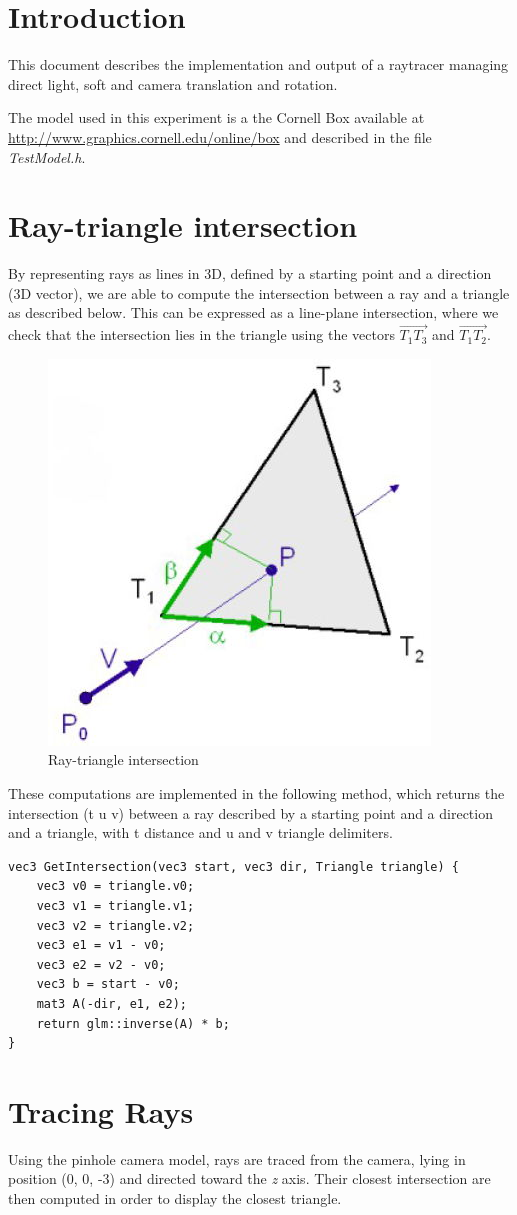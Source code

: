 \section*{Introduction}
This document describes the implementation and output of a raytracer managing direct light, soft  and camera translation and rotation.

The model used in this experiment is a the Cornell Box available at \url{http://www.graphics.cornell.edu/online/box} and described in the file \textit{TestModel.h}.

\setcounter{section}{0} 

\section{Ray-triangle intersection}
By representing rays as lines in 3D, defined by a starting point and a direction (3D vector), we are able to compute the intersection between a ray and a triangle as described below.
This can be expressed as a line-plane intersection, where we check that the intersection lies in the triangle using the vectors $\vec{T_1T_3}$ and $\vec{T_1T_2}$.

\begin{figure}[H]
\centering
\includegraphics[width=0.2\linewidth]{img/ray.jpg}
\caption{Ray-triangle intersection}
\end{figure}

These computations are implemented in the following method, which returns the intersection (t u v) between a ray described by a starting point and a direction and a triangle, with t distance and u and v triangle delimiters.
\begin{lstlisting}
vec3 GetIntersection(vec3 start, vec3 dir, Triangle triangle) {
	vec3 v0 = triangle.v0;
	vec3 v1 = triangle.v1;
	vec3 v2 = triangle.v2;
	vec3 e1 = v1 - v0;
	vec3 e2 = v2 - v0;
	vec3 b = start - v0;
	mat3 A(-dir, e1, e2);
	return glm::inverse(A) * b;
}
\end{lstlisting}


\section{Tracing Rays}
Using the pinhole camera model, rays are traced from the camera, lying in position (0, 0, -3) and directed toward the \textit{z} axis. Their closest intersection are then computed in order to display the closest triangle.

